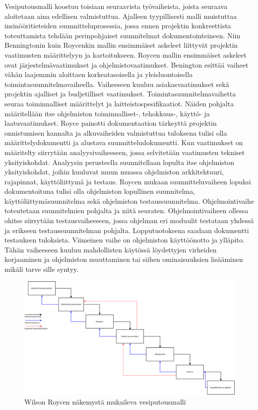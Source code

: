 \documentclass[finnish,12pt]{tktltiki2}
\theoremstyle{definition}
\theoremstyle{remark}
\begin{document}
Vesiputousmalli koostuu toisiaan seuraavista työvaiheista, joista seuraava aloitetaan aina edellisen valmistuttua. Ajalleen tyypillisesti malli muistuttaa insinööritieteiden suunnitteluprosessia, jossa ennen projektin konkreettista toteuttamista tehdään perinpohjaiset suunnitelmat dokumentointeineen. Niin Benningtonin kuin Roycenkin mallin ensimmäiset askeleet liittyvät projektin vaatimusten määrittelyyn ja kartoitukseen. Roycen mallin ensimmäiset askeleet ovat järjestelmävaatimukset ja ohjelmistovaatimukset\cite{Royce1970}. Benington esittää vaiheet vähän laajemmin aloittaen korkeatasoisella ja yleisluontoisella toimintasuunnitelmavaiheella. Vaiheeseen kuuluu asiakasvaatimukset sekä projektin ajalliset ja budjetilliset vaatimukset. Toimintasuunnitelmavaihetta seuraa toiminnalliset määrittelyt ja laitteistospesifikaatiot. \cite{Benington:1987:PLC:41765.41799} Näiden pohjalta määritellään itse ohjelmiston toiminnalliset-, tehokkuus-, käyttö- ja laatuvaatimukset. Royce painotti dokumentaation tärkeyttä projektin onnistumisen kannalta ja alkuvaiheiden valmistuttua tuloksena tulisi olla määrittelydokumentti ja alustava suunnitteludokumentti. Kun vaatimukset on määritelty siirrytään analyysivaiheeseen, jossa selvitetään vaatimusten tekniset yksityiskohdat. Analyysin perusteella suunnitellaan lopulta itse ohjelmiston yksityiskohdat, joihin kuuluvat muun muassa ohjelmiston arkkitehtuuri, rajapinnat, käyttöliittymä ja testaus. Roycen mukaan suunnitteluvaiheen lopuksi dokumentoituna tulisi olla ohjelmiston lopullinen suunnitelma, käyttöliittymäsuunnitelma sekä ohjelmiston testaussuunnitelma. Ohjelmointivaihe toteutetaan suunnitelmien pohjalta ja niitä seuraten. Ohjelmointivaiheen ollessa ohitse siirrytään testausvaiheeseen, jossa ohjelman eri moduulit testataan yhdessä ja erikseen testaussuunnitelman pohjalta. Lopputuotoksena saadaan dokumentti testauksen tuloksista. Viimeinen vaihe on ohjelmiston käyttöönotto ja ylläpito. Tähän vaiheeseen kuuluu mahdollisten käytössä löydettyjen virheiden korjaaminen ja ohjelmiston muuttaminen tai siihen ominaisuuksien lisääminen mikäli tarve sille syntyy.

\begin{figure}[ht!]
\centering
{}
\includegraphics[width=150mm]{Diagram1.png}
\caption{Wilson Roycen näkemystä mukaileva vesiputousmalli}
\label{overflow}
\end{figure}
\end{document}
